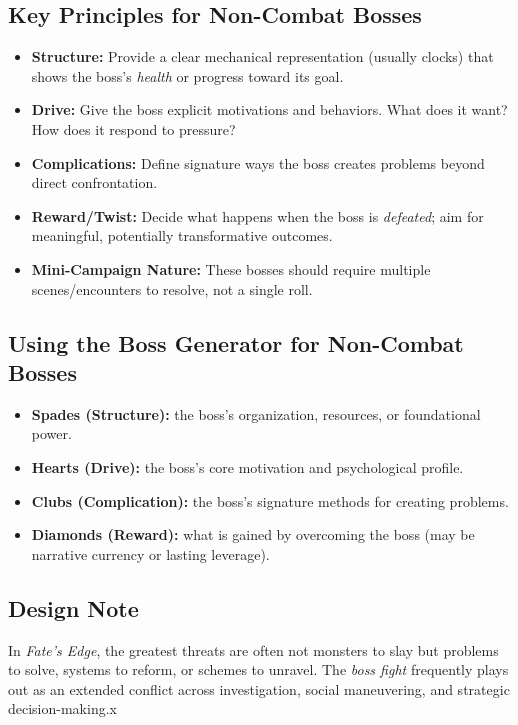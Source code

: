 \subsection*{Key Principles for Non-Combat Bosses}
\begin{itemize}
  \item \textbf{Structure:} Provide a clear mechanical representation (usually clocks) that shows the boss's \emph{health} or progress toward its goal.
  \item \textbf{Drive:} Give the boss explicit motivations and behaviors. What does it want? How does it respond to pressure?
  \item \textbf{Complications:} Define signature ways the boss creates problems beyond direct confrontation.
  \item \textbf{Reward/Twist:} Decide what happens when the boss is \emph{defeated}; aim for meaningful, potentially transformative outcomes.
  \item \textbf{Mini-Campaign Nature:} These bosses should require multiple scenes/encounters to resolve, not a single roll.
\end{itemize}

\subsection*{Using the Boss Generator for Non-Combat Bosses}
\begin{itemize}
  \item \textbf{Spades (Structure):} the boss's organization, resources, or foundational power.
  \item \textbf{Hearts (Drive):} the boss's core motivation and psychological profile.
  \item \textbf{Clubs (Complication):} the boss's signature methods for creating problems.
  \item \textbf{Diamonds (Reward):} what is gained by overcoming the boss (may be narrative currency or lasting leverage).
\end{itemize}

\subsection*{Design Note}
In \textit{Fate's Edge}, the greatest threats are often not monsters to slay but problems to solve, systems to reform, or schemes to unravel. The \emph{boss fight} frequently plays out as an extended conflict across investigation, social maneuvering, and strategic decision-making.x
